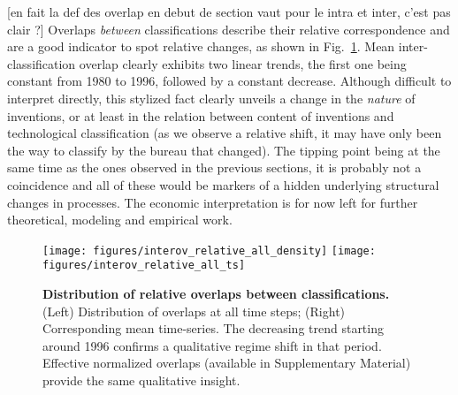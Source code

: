\documentclass[10pt,A4]{article}
\begin{document}
[en fait la def des overlap en debut de section vaut pour le intra et inter, c'est pas clair ?] Overlaps \emph{between} classifications describe their relative correspondence and are a good indicator to spot relative changes, as shown in Fig.~\ref{fig:inter-classif-overlap}. Mean inter-classification overlap clearly exhibits two linear trends, the first one being constant from 1980 to 1996, followed by a constant decrease. Although difficult to interpret directly, this stylized fact clearly unveils a change in the \emph{nature} of inventions, or at least in the relation between content of inventions and technological classification (as we observe a relative shift, it may have only been the way to classify by the bureau that changed). The tipping point being at the same time as the ones observed in the previous sections, it is probably not a coincidence and all of these would be markers of a hidden underlying structural changes in processes. The economic interpretation is for now left for further theoretical, modeling and empirical work.




\begin{figure}[!ht]

\texttt{[image: figures/interov\_relative\_all\_density]}
\texttt{[image: figures/interov\_relative\_all\_ts]}

\caption{\textbf{Distribution of relative overlaps between classifications.} (Left) Distribution of overlaps at all time steps; (Right) Corresponding mean time-series. The decreasing trend starting around 1996 confirms a qualitative regime shift in that period. Effective normalized overlaps (available in Supplementary Material) provide the same qualitative insight.}
\label{fig:inter-classif-overlap}
\end{figure}
\end{document}
